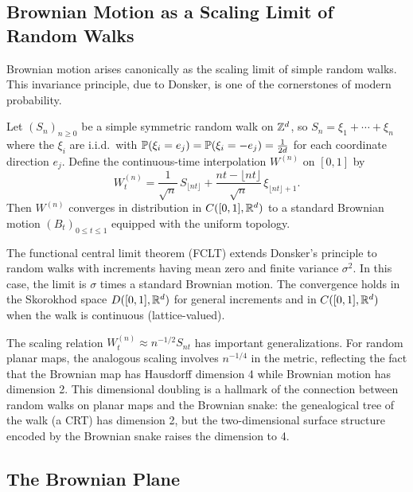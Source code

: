 \subsection{Brownian Motion as a Scaling Limit of Random Walks}

Brownian motion arises canonically as the scaling limit of simple random walks. This invariance principle, due to Donsker, is one of the cornerstones of modern probability.

\begin{theorem}
Let $(S_n)_{n \geq 0}$ be a simple symmetric random walk on $\Z^d$, so $S_n = \xi_1 + \cdots + \xi_n$ where the $\xi_i$ are i.i.d.\ with $\P(\xi_i = e_j) = \P(\xi_i = -e_j) = \frac{1}{2d}$ for each coordinate direction $e_j$. Define the continuous-time interpolation $W^{(n)}$ on $[0,1]$ by
\[
    W^{(n)}_t = \frac{1}{\sqrt{n}}\,S_{\lfloor nt \rfloor} + \frac{nt - \lfloor nt \rfloor}{\sqrt{n}}\,\xi_{\lfloor nt \rfloor + 1}.
\]
Then $W^{(n)}$ converges in distribution in $C([0,1],\R^d)$ to a standard Brownian motion $(B_t)_{0 \leq t \leq 1}$ equipped with the uniform topology.
\end{theorem}

\begin{remark}
The functional central limit theorem (FCLT) extends Donsker's principle to random walks with increments having mean zero and finite variance $\sigma^2$. In this case, the limit is $\sigma$ times a standard Brownian motion. The convergence holds in the Skorokhod space $D([0,1],\R^d)$ for general increments and in $C([0,1],\R^d)$ when the walk is continuous (lattice-valued).
\end{remark}

\begin{remark}
The scaling relation $W^{(n)}_t \approx n^{-1/2} S_{nt}$ has important generalizations. For random planar maps, the analogous scaling involves $n^{-1/4}$ in the metric, reflecting the fact that the Brownian map has Hausdorff dimension 4 while Brownian motion has dimension 2. This dimensional doubling is a hallmark of the connection between random walks on planar maps and the Brownian snake: the genealogical tree of the walk (a CRT) has dimension 2, but the two-dimensional surface structure encoded by the Brownian snake raises the dimension to 4.
\end{remark}

\subsection{The Brownian Plane}

